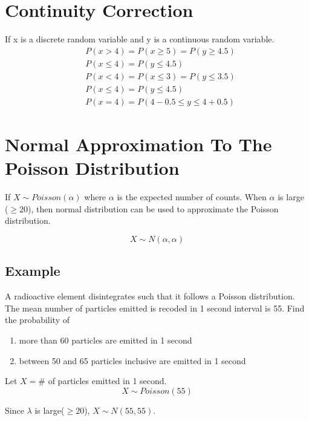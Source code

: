 \documentclass{article}
\begin{document}
    \section*{Continuity Correction}
    If x is a discrete random variable and y is a continuous random variable.
    \begin{align*}
        &P(x>4) = P(x\geq 5) = P(y \geq 4.5)\\
        &P(x \leq 4) = P(y \leq 4.5)\\
        &P(x<4) = P(x \leq 3) = P(y \leq3.5)\\
        &P(x \leq 4) = P(y \leq 4.5)\\
        &P(x = 4) = P(4-0.5 \leq y \leq 4+0.5)
    \end{align*}

    \section*{Normal Approximation To The Poisson Distribution}
    If $X \sim Poisson(\alpha)$ where $\alpha$ is the expected number of counts.
    When $\alpha$ is large ($\geq 20$), then normal distribution can be used to approximate the
    Poisson distribution.
    
    \begin{equation*}
        X \sim N(\alpha, \alpha)
    \end{equation*}
    
    \subsection*{Example}
    A radioactive element disintegrates such that it follows a Poisson distribution. The
    mean number of particles emitted is recoded in 1 second interval is 55. Find the probability of

    \begin{enumerate}[label={(\alph*)}]
        \item more than 60 particles are emitted in 1 second
        \item  between 50 and 65 particles inclusive are emitted in 1 second
    \end{enumerate}

    Let $X = \#$ of particles emitted in 1 second.
    \begin{equation*}
        X \sim Poisson(55)
    \end{equation*}

    Since $\lambda $ is large($\geq 20$), $X \sim N(55, 55)$.
\end{document}
